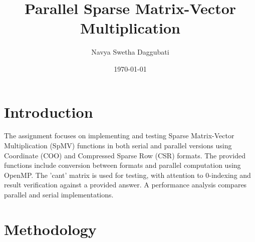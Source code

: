 \documentclass[11pt, twocolumn]{article}
\title{Parallel Sparse Matrix-Vector Multiplication }
\author{Navya Swetha Daggubati}
\date{\today}
\begin{document}
\maketitle

\section{Introduction}
The assignment focuses on implementing and testing Sparse Matrix-Vector Multiplication (SpMV) functions in both serial and parallel versions using Coordinate (COO) and Compressed Sparse Row (CSR) formats. The provided functions include conversion between formats and parallel computation using OpenMP. The 'cant' matrix is used for testing, with attention to 0-indexing and result verification against a provided answer. A performance analysis compares parallel and serial implementations. 

\section{Methodology}
\end{document}
